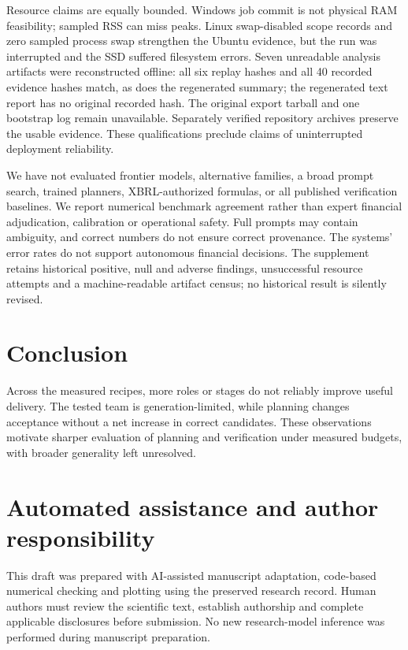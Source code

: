 \documentclass[10pt,letterpaper]{article}
\begin{document}
Resource claims are equally bounded. Windows job commit is not physical RAM feasibility; sampled RSS can miss peaks. Linux swap-disabled scope records and zero sampled process swap strengthen the Ubuntu evidence, but the run was interrupted and the SSD suffered filesystem errors. Seven unreadable analysis artifacts were reconstructed offline: all six replay hashes and all 40 recorded evidence hashes match, as does the regenerated summary; the regenerated text report has no original recorded hash. The original export tarball and one bootstrap log remain unavailable. Separately verified repository archives preserve the usable evidence. These qualifications preclude claims of uninterrupted deployment reliability.

We have not evaluated frontier models, alternative families, a broad prompt search, trained planners, XBRL-authorized formulas, or all published verification baselines. We report numerical benchmark agreement rather than expert financial adjudication, calibration or operational safety. Full prompts may contain ambiguity, and correct numbers do not ensure correct provenance. The systems' error rates do not support autonomous financial decisions. The supplement retains historical positive, null and adverse findings, unsuccessful resource attempts and a machine-readable artifact census; no historical result is silently revised.


\section{Conclusion}
Across the measured recipes, more roles or stages do not reliably improve useful delivery. The tested team is generation-limited, while planning changes acceptance without a net increase in correct candidates. These observations motivate sharper evaluation of planning and verification under measured budgets, with broader generality left unresolved.
\section*{Automated assistance and author responsibility}
This draft was prepared with AI-assisted manuscript adaptation, code-based numerical checking and plotting using the preserved research record. Human authors must review the scientific text, establish authorship and complete applicable disclosures before submission. No new research-model inference was performed during manuscript preparation.


\end{document}

